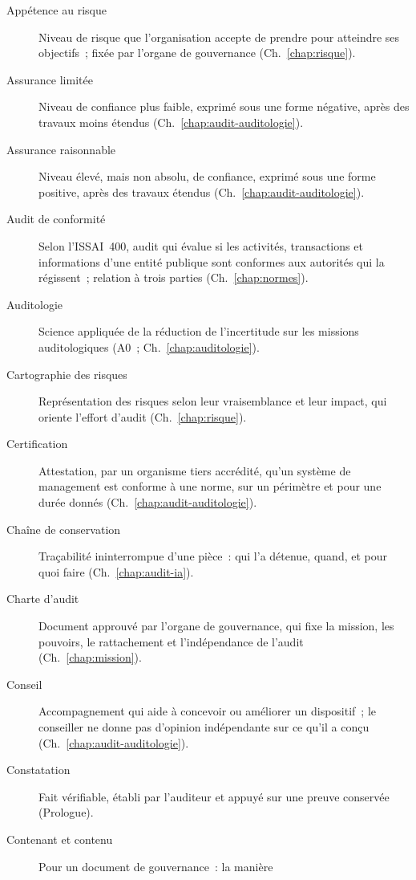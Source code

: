 \begin{description}
    \item[Appétence au risque] Niveau de risque que l'organisation accepte
          de prendre pour atteindre ses objectifs~; fixée par l'organe de
          gouvernance (Ch.~\ref{chap:risque}).
    \item[Assurance limitée] Niveau de confiance plus faible, exprimé sous
          une forme négative, après des travaux moins étendus
          (Ch.~\ref{chap:audit-auditologie}).
    \item[Assurance raisonnable] Niveau élevé, mais non absolu, de confiance,
          exprimé sous une forme positive, après des travaux étendus
          (Ch.~\ref{chap:audit-auditologie}).
    \item[Audit de conformité] Selon l'ISSAI~400, audit qui évalue si les
          activités, transactions et informations d'une entité publique sont
          conformes aux autorités qui la régissent~; relation à trois
          parties (Ch.~\ref{chap:normes}).
    \item[Auditologie] Science appliquée de la réduction de l'incertitude
          sur les missions auditologiques (A0~; Ch.~\ref{chap:auditologie}).
    \item[Cartographie des risques] Représentation des risques selon leur
          vraisemblance et leur impact, qui oriente l'effort d'audit
          (Ch.~\ref{chap:risque}).
    \item[Certification] Attestation, par un organisme tiers accrédité,
          qu'un système de management est conforme à une norme, sur un
          périmètre et pour une durée donnés (Ch.~\ref{chap:audit-auditologie}).
    \item[Chaîne de conservation] Traçabilité ininterrompue d'une pièce~:
          qui l'a détenue, quand, et pour quoi faire (Ch.~\ref{chap:audit-ia}).
    \item[Charte d'audit] Document approuvé par l'organe de gouvernance, qui
          fixe la mission, les pouvoirs, le rattachement et l'indépendance
          de l'audit (Ch.~\ref{chap:mission}).
    \item[Conseil] Accompagnement qui aide à concevoir ou améliorer un
          dispositif~; le conseiller ne donne pas d'opinion indépendante sur
          ce qu'il a conçu (Ch.~\ref{chap:audit-auditologie}).
    \item[Constatation] Fait vérifiable, établi par l'auditeur et appuyé
          sur une preuve conservée (Prologue).
    \item[Contenant et contenu] Pour un document de gouvernance~: la manière

\end{description}
